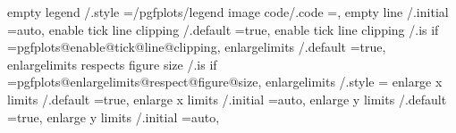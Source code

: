 {{{{{{{{{{{empty legend                                 /.style                                                                                   ={/pgfplots/legend image code/.code                                                                                 =},            
empty line                                   /.initial                                                                                 =auto,                                                                                                              
enable tick line clipping                    /.default                                                                                 =true,                                                                                                              
enable tick line clipping                    /.is if                                                                                   =pgfplots@enable@tick@line@clipping,                                                                                
enlargelimits                                /.default                                                                                 =true,                                                                                                              
enlargelimits respects figure size           /.is if                                                                                   =pgfplots@enlargelimits@respect@figure@size,                                                                        
enlargelimits                                /.style                                                                                   ={%
enlarge x limits                             /.default                                                                                 =true,                                                                                                              
enlarge x limits                             /.initial                                                                                 =auto,                                                                                                              
enlarge y limits                             /.default                                                                                 =true,                                                                                                              
enlarge y limits                             /.initial                                                                                 =auto,                                                                                                              
}}}}}}}}}}}}
